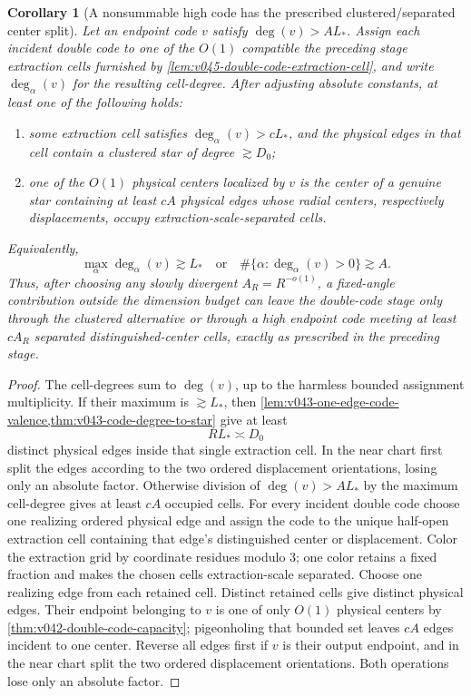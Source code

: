 \documentclass[10pt]{article}
\newtheorem{corollary}[theorem]{Corollary}
\begin{document}
\begin{corollary}[A nonsummable high code has the prescribed clustered/separated center split]
\label{cor:v045-extraction-cell-split}
Let an endpoint code \(v\) satisfy
\(\deg(v)>AL_*\).  Assign each incident double code to one of the \(O(1)\) compatible
the preceding stage extraction cells furnished by
\cref{lem:v045-double-code-extraction-cell}, and write \(\deg_\alpha(v)\) for the resulting
cell-degree.  After adjusting absolute constants, at least one of the following holds:
\begin{enumerate}[label=\textnormal{(\roman*)}]
\item some extraction cell satisfies \(\deg_\alpha(v)>cL_*\), and the physical edges in that cell
contain a clustered star of degree \(\gtrsim D_0\);
\item one of the \(O(1)\) physical centers localized by \(v\) is the center of a genuine star
containing at least \(cA\) physical edges whose radial centers, respectively displacements, occupy
extraction-scale-separated cells.
\end{enumerate}
Equivalently,
\begin{equation}
\label{eq:v045-extraction-cell-split}
\boxed{
\max_\alpha\deg_\alpha(v)
\gtrsim
L_*
\quad\text{or}\quad
\#\{\alpha:\deg_\alpha(v)>0\}
\gtrsim
A.
}
\end{equation}
Thus, after choosing any slowly divergent \(A_R=R^{-o(1)}\), a fixed-angle contribution outside
the dimension budget can leave the double-code stage only through the clustered alternative or
through a high endpoint code meeting at least \(cA_R\) separated distinguished-center cells,
exactly as prescribed in the preceding stage.
\end{corollary}

\begin{proof}
The cell-degrees sum to \(\deg(v)\), up to the harmless bounded assignment multiplicity.  If their
maximum is \(\gtrsim L_*\), then
\cref{lem:v043-one-edge-code-valence,thm:v043-code-degree-to-star} give at least
\[
R L_*
\asymp
D_0
\]
distinct physical edges inside that single extraction cell.  In the near chart first split the
edges according to the two ordered displacement orientations, losing only an absolute factor.
Otherwise division of \(\deg(v)>AL_*\) by the maximum cell-degree gives at least \(cA\) occupied
cells.  For every incident double code choose one realizing ordered physical edge and assign the
code to the unique half-open extraction cell containing that edge's distinguished center or
displacement.  Color the extraction grid by coordinate residues modulo \(3\); one color retains a
fixed fraction and makes the chosen cells extraction-scale separated.  Choose one realizing edge
from each retained cell.  Distinct retained cells give distinct physical edges.  Their endpoint
belonging to \(v\) is one of only \(O(1)\) physical centers by
\cref{thm:v042-double-code-capacity}; pigeonholing that bounded set leaves \(cA\) edges incident to
one center.  Reverse all edges first if \(v\) is their output endpoint, and in the near chart split
the two ordered displacement orientations.  Both operations lose only an absolute factor.
\end{proof}
\end{document}
